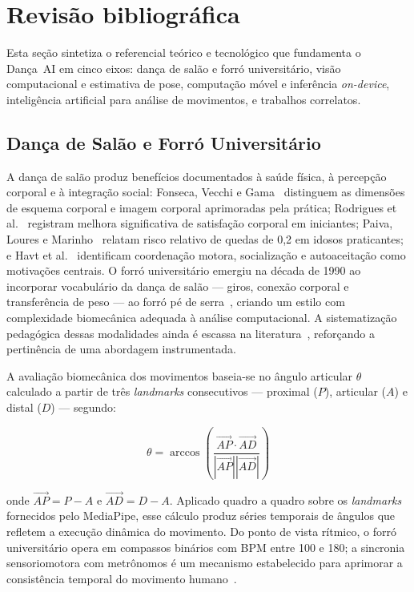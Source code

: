 
\newpage
\section{Revisão bibliográfica}
\label{sc:revisao}

Esta seção sintetiza o referencial teórico e tecnológico que fundamenta o
Dança~AI em cinco eixos: dança de salão e forró universitário, visão
computacional e estimativa de pose, computação móvel e inferência
\textit{on-device}, inteligência artificial para análise de movimentos, e
trabalhos correlatos.

\subsection{Dança de Salão e Forró Universitário}
\label{sub:danca}

A dança de salão produz benefícios documentados à saúde física, à percepção
corporal e à integração social: Fonseca, Vecchi e Gama~\cite{fonseca2012}
distinguem as dimensões de esquema corporal e imagem corporal aprimoradas pela
prática; Rodrigues et al.~\cite{rodrigues2011} registram melhora significativa
de satisfação corporal em iniciantes; Paiva, Loures e Marinho~\cite{paiva2019danca}
relatam risco relativo de quedas de 0{,}2 em idosos praticantes; e Havt et
al.~\cite{havt2026dancar} identificam coordenação motora, socialização e
autoaceitação como motivações centrais. O forró universitário emergiu na década
de 1990 ao incorporar vocabulário da dança de salão --- giros, conexão corporal
e transferência de peso --- ao forró pé de serra~\cite{silva2022aspectos}, criando
um estilo com complexidade biomecânica adequada à análise computacional. A
sistematização pedagógica dessas modalidades ainda é escassa na
literatura~\cite{porto2023ressignificando}, reforçando a pertinência de uma
abordagem instrumentada.

A avaliação biomecânica dos movimentos baseia-se no ângulo articular $\theta$
calculado a partir de três \textit{landmarks} consecutivos --- proximal ($P$),
articular ($A$) e distal ($D$) --- segundo:

\begin{equation}
    \theta = \arccos\!\left(\frac{\overrightarrow{AP} \cdot \overrightarrow{AD}}
    {\left|\overrightarrow{AP}\right|\left|\overrightarrow{AD}\right|}\right)
    \label{eq:angulo}
\end{equation}

\noindent onde $\overrightarrow{AP} = P - A$ e $\overrightarrow{AD} = D - A$.
Aplicado quadro a quadro sobre os \textit{landmarks} fornecidos pelo MediaPipe,
esse cálculo produz séries temporais de ângulos que refletem a execução
dinâmica do movimento. Do ponto de vista rítmico, o forró universitário opera
em compassos binários com BPM entre 100 e 180; a sincronia sensoriomotora
com metrônomos é um mecanismo estabelecido para aprimorar a consistência
temporal do movimento humano~\cite{repp2013sms, karageorghis2019dance,
bood2013running, whitton2023sms}.


